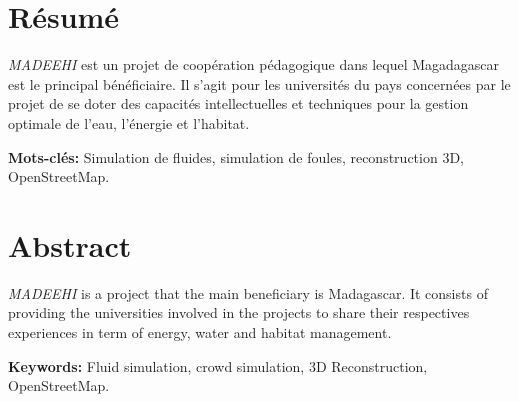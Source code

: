 \setcounter{page}{-1}
\section*{Résumé}

\textit{MADEEHI} est un projet de coopération pédagogique dans lequel Magadagascar est le principal bénéficiaire. Il s'agit pour les universités du pays concernées par le projet de se doter des capacités intellectuelles et techniques pour la gestion optimale de l'eau, l'énergie et l'habitat. \newline

\textbf{Mots-clés:} Simulation de fluides, simulation de foules, reconstruction 3D, OpenStreetMap.

\section*{Abstract}

\textit{MADEEHI} is a project that the main beneficiary is Madagascar. It consists of providing the universities involved in the projects to share their respectives experiences in term of energy, water and habitat management. \newline

\textbf{Keywords:} Fluid simulation, crowd simulation, 3D Reconstruction, OpenStreetMap.